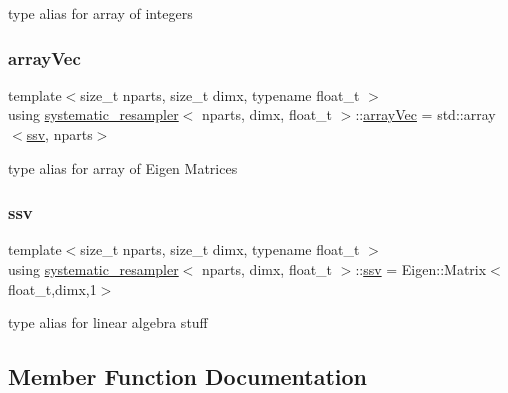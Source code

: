 type alias for array of integers \mbox{\label{classsystematic__resampler_a89263b385b61687341d67a717da78dc1}} 
\subsubsection{\texorpdfstring{array\+Vec}{arrayVec}}
{\footnotesize\ttfamily template$<$size\+\_\+t nparts, size\+\_\+t dimx, typename float\+\_\+t $>$ \\
using \hyperlink{classsystematic__resampler}{systematic\+\_\+resampler}$<$ nparts, dimx, float\+\_\+t $>$\+::\hyperlink{classrbase_aa12fc826befa6ba0647b5f59ebc396ee}{array\+Vec} =  std\+::array$<$\hyperlink{classrbase_ae20e0b8df15aa109252f57ecbf1f20f8}{ssv}, nparts$>$}

type alias for array of Eigen Matrices \mbox{\label{classsystematic__resampler_a9e158fbf5875f93e9cb4da562928e649}} 
\subsubsection{\texorpdfstring{ssv}{ssv}}
{\footnotesize\ttfamily template$<$size\+\_\+t nparts, size\+\_\+t dimx, typename float\+\_\+t $>$ \\
using \hyperlink{classsystematic__resampler}{systematic\+\_\+resampler}$<$ nparts, dimx, float\+\_\+t $>$\+::\hyperlink{classrbase_ae20e0b8df15aa109252f57ecbf1f20f8}{ssv} =  Eigen\+::\+Matrix$<$float\+\_\+t,dimx,1$>$}

type alias for linear algebra stuff 

\subsection{Member Function Documentation}
\mbox{\label{classsystematic__resampler_a9467aec6002043f35f40e9e4857021ed}} 
